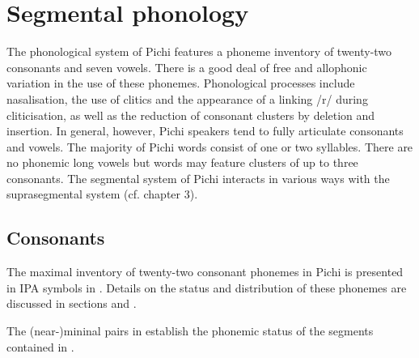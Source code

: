 \chapter{Segmental phonology}

The phonological system of Pichi features a phoneme inventory of twenty-two consonants and seven vowels. There is a good deal of free and allophonic variation in the use of these phonemes. Phonological processes include nasalisation, the use of clitics and the appearance of a linking /r/ during cliticisation, as well as the reduction of consonant clusters by deletion and insertion. In general, however, Pichi speakers tend to fully articulate consonants and vowels. The majority of Pichi words consist of one or two syllables. There are no phonemic long vowels but words may feature clusters of up to three consonants. The segmental system of Pichi interacts in various ways with the suprasegmental system (cf. chapter 3).

\section{Consonants}\label{sec:2.1}

The maximal inventory of twenty-two consonant phonemes in Pichi is presented in IPA symbols in . Details on the status and distribution of these phonemes are discussed in sections  and .

\begin{table}
\caption{Consonant and approximant phonemes}
\label{tab:key:2.1}
\end{table}
The (near-)mininal pairs in  establish the phonemic status of the segments contained in .

